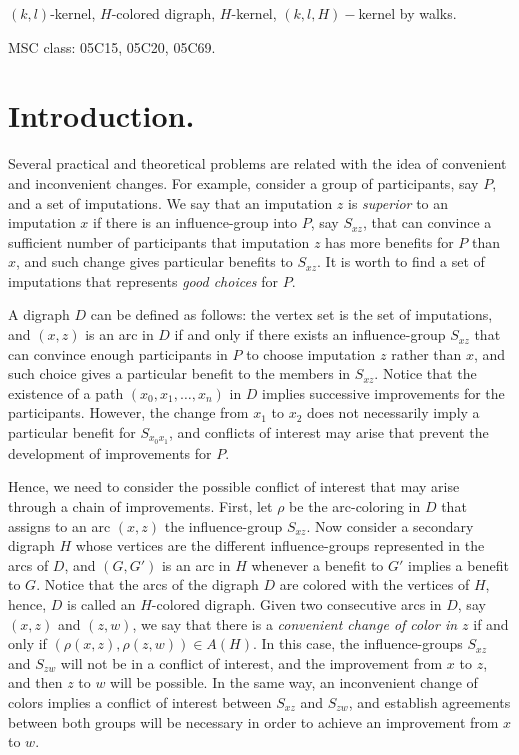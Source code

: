 \documentclass[10pt,a4paper]{article}
\begin{document}
$(k,l)$-kernel, $H$-colored digraph, $H$-kernel,  $(k,l,H)-$kernel by walks.

MSC class: 05C15, 05C20, 05C69.

\section{Introduction.}
Several practical and theoretical problems are related with the idea of convenient and inconvenient changes. For example, consider a group of participants, say $P$, and a set of imputations. We say that an imputation $z$ is \textit{superior} to an imputation $x$ if there is an influence-group into $P$, say $S_{xz}$, that can convince a sufficient number of participants that imputation $z$ has more benefits for $P$ than $x$, and such change gives particular benefits to $S_{xz}$. It is worth to find a set of imputations that represents \textit{good choices} for $P$. 

A digraph $D$ can be defined as follows: the vertex set is the set of imputations, and $(x,z)$ is an arc in $D$ if and only if there exists an influence-group $S_{xz}$ that can convince enough participants in $P$ to choose imputation $z$ rather than $x$, and such choice gives a particular benefit to the members in $S_{xz}$. Notice that the existence of a path $(x_{0}, x_{1}, \ldots , x_{n})$ in $D$ implies successive improvements for the participants. However, the change from $x_{1}$ to $x_{2}$ does not necessarily imply a particular benefit for $S_{x_{0}x_{1}}$, and conflicts of interest may arise that prevent the development of improvements for $P$.

Hence, we need to consider the possible conflict of interest that may arise through a chain of improvements. First, let $\rho$ be the arc-coloring in $D$ that assigns to an arc $(x,z)$ the influence-group $S_{xz}$. 
Now consider a secondary digraph $H$ whose vertices are the different influence-groups represented in the arcs of $D$, and $(G, G')$ is an arc in $H$ whenever a benefit to $G'$ implies a benefit to $G$. Notice that the arcs of the digraph $D$ are colored with the vertices of $H$, hence, $D$ is called an $H$-colored digraph.
Given two consecutive arcs in $D$, say $(x,z)$ and $(z,w)$, we say that there is a \textit{convenient change of color in $z$} if and only if $(\rho (x,z), \rho (z,w)) \in A(H)$. In this case, the influence-groups $S_{xz}$ and $S_{zw}$ will not be in a conflict of interest, and the improvement from $x$ to $z$, and then $z$ to $w$ will be possible. In the same way, an inconvenient change of colors implies a conflict of interest between $S_{xz}$ and $S_{zw}$, and establish agreements between both groups will be necessary in order to achieve an improvement from $x$ to $w$. 
\end{document}

